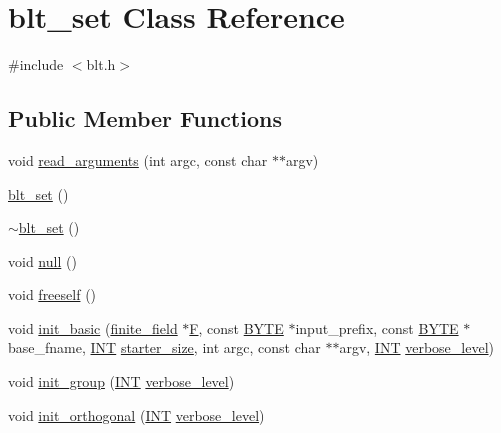 \hypertarget{classblt__set}{}\section{blt\+\_\+set Class Reference}
\label{classblt__set}


{\ttfamily \#include $<$blt.\+h$>$}

\subsection*{Public Member Functions}
\begin{DoxyCompactItemize}
\item 
void \mbox{\hyperlink{classblt__set_a2c9376bf8921d08c686526482aefd1f0}{read\+\_\+arguments}} (int argc, const char $\ast$$\ast$argv)
\item 
\mbox{\hyperlink{classblt__set_a04973f08aa5193284ac3a51ef9d2d322}{blt\+\_\+set}} ()
\item 
\mbox{\hyperlink{classblt__set_adbf61747988c80615e72b179298ed19f}{$\sim$blt\+\_\+set}} ()
\item 
void \mbox{\hyperlink{classblt__set_a2345145a41264dca01b4bcc40dfe54d4}{null}} ()
\item 
void \mbox{\hyperlink{classblt__set_abc48dfb6e214be890bd2a8c28dcdaae0}{freeself}} ()
\item 
void \mbox{\hyperlink{classblt__set_a266dfb03016b68440e810771101442cc}{init\+\_\+basic}} (\mbox{\hyperlink{classfinite__field}{finite\+\_\+field}} $\ast$\mbox{\hyperlink{classblt__set_ae3a4dd741b4d034599339e933d2599a0}{F}}, const \mbox{\hyperlink{galois_8h_ab6cc7b4aeb6ea31aba2b3fbfc83ff5e6}{B\+Y\+TE}} $\ast$input\+\_\+prefix, const \mbox{\hyperlink{galois_8h_ab6cc7b4aeb6ea31aba2b3fbfc83ff5e6}{B\+Y\+TE}} $\ast$base\+\_\+fname, \mbox{\hyperlink{galois_8h_a09fddde158a3a20bd2dcadb609de11dc}{I\+NT}} \mbox{\hyperlink{classblt__set_a5227d5487da07366a96c3a1c4eba1814}{starter\+\_\+size}}, int argc, const char $\ast$$\ast$argv, \mbox{\hyperlink{galois_8h_a09fddde158a3a20bd2dcadb609de11dc}{I\+NT}} \mbox{\hyperlink{simeon_8_c_a818073fbcc2f439e7c56952f67386122}{verbose\+\_\+level}})
\item 
void \mbox{\hyperlink{classblt__set_a9e5aede3bbac6f5e1dd31a8965bba200}{init\+\_\+group}} (\mbox{\hyperlink{galois_8h_a09fddde158a3a20bd2dcadb609de11dc}{I\+NT}} \mbox{\hyperlink{simeon_8_c_a818073fbcc2f439e7c56952f67386122}{verbose\+\_\+level}})
\item 
void \mbox{\hyperlink{classblt__set_a030c4f21140e07855f55f68c7586b4ce}{init\+\_\+orthogonal}} (\mbox{\hyperlink{galois_8h_a09fddde158a3a20bd2dcadb609de11dc}{I\+NT}} \mbox{\hyperlink{simeon_8_c_a818073fbcc2f439e7c56952f67386122}{verbose\+\_\+level}})

\end{DoxyCompactItemize}
